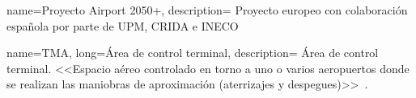 {
    name={Proyecto Airport 2050+},
    description=
    {   
        Proyecto europeo con colaboración española por parte de UPM, CRIDA e INECO
    }
}

{
    name={TMA},
    long={Área de control terminal},
    description=
    {   
        Área de control terminal. <<Espacio aéreo controlado en torno a uno o varios aeropuertos 
        donde se realizan las maniobras de aproximación (aterrizajes y despegues)>>~\cite{ENAIRE-web}.
    }
}

